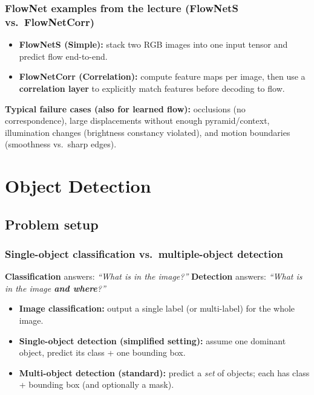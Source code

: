 \documentclass[11pt,a4paper]{article}
\begin{document}
\subsubsection{FlowNet examples from the lecture (FlowNetS vs.\ FlowNetCorr)}
\begin{itemize}
  \item \textbf{FlowNetS (Simple):} stack two RGB images into one input tensor and predict flow end-to-end.
  \item \textbf{FlowNetCorr (Correlation):} compute feature maps per image, then use a \textbf{correlation layer}
        to explicitly match features before decoding to flow.
\end{itemize}

\begin{qbox}
\textbf{Typical failure cases (also for learned flow):}
occlusions (no correspondence), large displacements without enough pyramid/context,
illumination changes (brightness constancy violated), and motion boundaries (smoothness vs.\ sharp edges).
\end{qbox}

\section{Object Detection}

\subsection{Problem setup}

\subsubsection{Single-object classification vs.\ multiple-object detection}

\begin{intbox}
\textbf{Classification} answers: \emph{``What is in the image?''}
\quad\quad
\textbf{Detection} answers: \emph{``What is in the image \textbf{and where}?''}
\end{intbox}

\begin{itemize}
  \item \textbf{Image classification:} output a single label (or multi-label) for the whole image.
  \item \textbf{Single-object detection (simplified setting):} assume one dominant object, predict its class + one bounding box.
  \item \textbf{Multi-object detection (standard):} predict a \emph{set} of objects; each has class + bounding box (and optionally a mask).
\end{itemize}
\end{document}
